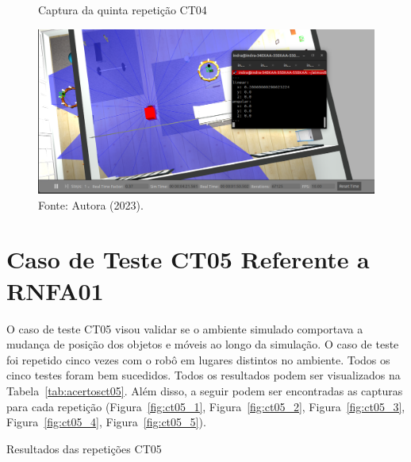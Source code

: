 \begin{figure}[H]
    \centering
    \caption{Captura da quinta repetição CT04}
    \includegraphics[scale=0.35]{ct04_5.png}
    \caption*{Fonte: Autora (2023).}
    \label{fig:ct04_5}
\end{figure}

\newpage

\section{Caso de Teste CT05 Referente a RNFA01}
O caso de teste CT05 visou validar se o ambiente simulado comportava a mudança de posição dos objetos e móveis ao longo da simulação. O caso de teste foi repetido cinco vezes com o robô em lugares distintos no ambiente. Todos os cinco testes foram bem sucedidos. Todos os resultados podem ser visualizados na Tabela~\ref{tab:acertosct05}. Além disso, a seguir podem ser encontradas as capturas para cada repetição (Figura~\ref{fig:ct05_1}, Figura~\ref{fig:ct05_2}, Figura~\ref{fig:ct05_3}, Figura~\ref{fig:ct05_4}, Figura~\ref{fig:ct05_5}).


\begin{table}[H]
\centering
\caption{Resultados das repetições CT05}
\label{tab:acertosct05}
\caption*{Fonte: Autora (2023).}
\end{table}

